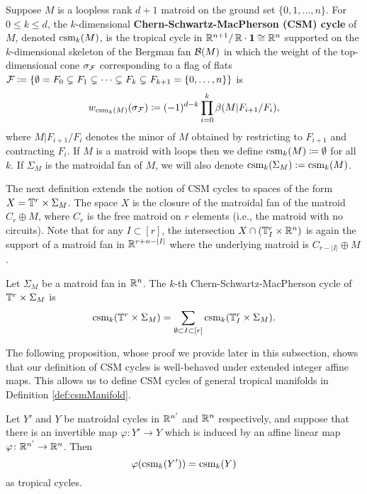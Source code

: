 \begin{defi}\label{def:chernweight}
Suppose $M$ is a loopless rank $d+1$ matroid on the ground set $\{0,1,\dots,n\}$.
For $0 \leq k \leq d$, the $k$-dimensional {\bf Chern-Schwartz-MacPherson (CSM) cycle}
of $M$, denoted $\operatorname{csm}_k(M)$, is the tropical cycle in $\mathbb{R}^{n+1} / \, \mathbb R \cdot \mathbf{1} \cong {\mathbb R}^n$ supported on the $k$-dimensional skeleton 
of the Bergman fan ${\mathcal B}(M)$ in which the weight of the top-dimensional cone $\sigma_\mathcal F$ corresponding to a flag of flats $\mathcal F \coloneqq  \{\emptyset = F_0
\subsetneq F_1 \subsetneq \dotsb \subsetneq F_{k} \subsetneq F_{k+1} =
\{0,\dotsc,n\}\}$ is 
\[ w_{\operatorname{csm}_k(M)}(\sigma_\mathcal F) \coloneqq  (-1)^{d-k} \prod_{i=0}^{k} \beta(M|F_{i+1}/F_i),\]
where $M|F_{i+1}/F_i$ denotes the minor of $M$ obtained by restricting to $F_{i+1}$ and contracting $F_i$.
If $M$ is a matroid with loops then we define $\operatorname{csm}_k(M) \coloneqq  \emptyset$ for all $k$. If $\Sigma_M$ is the matroidal fan of $M$, we will also denote $\operatorname{csm}_k(\Sigma_M) := \operatorname{csm}_k(M)$.
\end{defi}




The next definition extends the notion of CSM cycles to spaces of the form $X =  \mathbb{T}^r \times \Sigma_M$.
The space $X$ is the closure of the matroidal fan of the matroid $C_r \oplus M$, where $C_r$ is the  free matroid on $r$ elements (i.e., the matroid with no circuits).
Note that for any $I \subset [r]$, the intersection $X \cap (\mathbb{T}^r_I \times \mathbb{R}^n)$ is again the support of a matroid fan in  $\mathbb{R}^{r+n -|I|}$ where the underlying  matroid is $C_{r-|I|} \oplus M$. 

\begin{defi}\label{def:csmInTn}
Let $\Sigma_M$ be a matroid fan in $\mathbb{R}^n$.  The $k$-th Chern-Schwartz-MacPherson cycle of 
$\mathbb{T}^r \times \Sigma_M$  is  
$$\operatorname{csm}_k( \mathbb{T}^r \times \Sigma_M )  = \sum_{\emptyset \subset I \subset [r]} \operatorname{csm}_k(\mathbb{T}^r_I \times \Sigma_M ).$$
\end{defi}


The following 
proposition, whose proof we provide later in this subsection, shows that our definition of CSM cycles is well-behaved under extended integer affine  maps. This allows us to define CSM cycles of general tropical manifolds in Definition \ref{def:csmManifold}. 
 
\begin{prop}\label{thm:csmisomorphism}
Let $Y'$ and $Y$ be matroidal cycles in $\mathbb{R}^{n'}$ and $\mathbb{R}^n$ respectively, and suppose that there is an invertible map $\varphi: Y' \to Y$ which is induced by  an affine  linear map $\varphi \colon \mathbb{R}^{n'} \to \mathbb{R}^{n}$.
Then $$\varphi( \operatorname{csm}_k(Y')) =  \operatorname{csm}_k(Y)$$ as tropical cycles. 
\end{prop}

